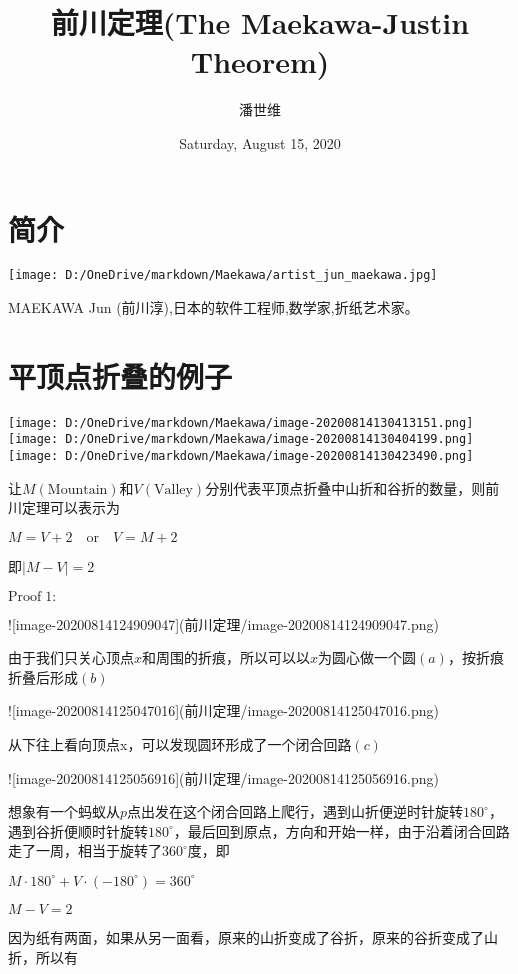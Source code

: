 \documentclass[a4paper,12pt]{article}
\begin{document}
\title {前川定理(The Maekawa-Justin Theorem)}
\author{潘世维}
\date{Saturday, August 15, 2020}
\maketitle
\section{简介} 
\texttt{[image: D:/OneDrive/markdown/Maekawa/artist\_jun\_maekawa.jpg]}

MAEKAWA Jun (前川淳),日本的软件工程师,数学家,折纸艺术家。

\section{平顶点折叠的例子}  

\texttt{[image: D:/OneDrive/markdown/Maekawa/image-20200814130413151.png]}
\texttt{[image: D:/OneDrive/markdown/Maekawa/image-20200814130404199.png]}
\texttt{[image: D:/OneDrive/markdown/Maekawa/image-20200814130423490.png]}


让$M(\text{Mountain})$和$V(\text{Valley})$分别代表平顶点折叠中山折和谷折的数量，则前川定理可以表示为

$M = V +2 \quad \text{or}\quad V = M + 2$

即$|M-V|=2$

$\text{Proof}\;1:$

![image-20200814124909047](前川定理/image-20200814124909047.png)

由于我们只关心顶点$x$和周围的折痕，所以可以以$x$为圆心做一个圆$(a)$，按折痕折叠后形成$(b)$

![image-20200814125047016](前川定理/image-20200814125047016.png)

从下往上看向顶点x，可以发现圆环形成了一个闭合回路$(c)$

![image-20200814125056916](前川定理/image-20200814125056916.png)

想象有一个蚂蚁从$p$点出发在这个闭合回路上爬行，遇到山折便逆时针旋转$180^{\circ}$，遇到谷折便顺时针旋转$180^{\circ}$，最后回到原点，方向和开始一样，由于沿着闭合回路走了一周，相当于旋转了$360^{\circ}$度，即

$M · 180^{\circ} +V ·(−180^{\circ}) = 360^{\circ}$

$M − V = 2$

因为纸有两面，如果从另一面看，原来的山折变成了谷折，原来的谷折变成了山折，所以有
\end{document}
